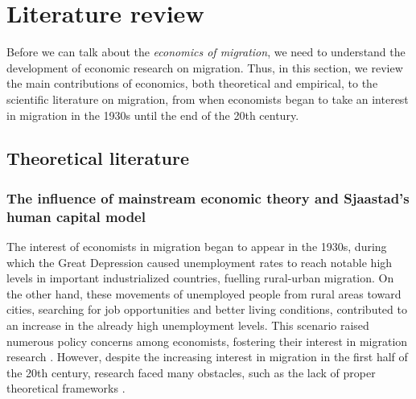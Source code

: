 \section{Literature review} \label{lit_review}

Before we can talk about the \textit{economics of migration}, we need to understand the development of economic research on migration. Thus, in this section, we review the main contributions of economics, both theoretical and empirical, to the scientific literature on migration, from when economists began to take an interest in migration in the 1930s until the end of the 20th century.

\subsection{Theoretical literature} \label{lit_review_theories}

\subsubsection{The influence of mainstream economic theory and Sjaastad's human capital model}

The interest of economists in migration began to appear in the 1930s, during which the Great Depression caused unemployment rates to reach notable high levels in important industrialized countries, fuelling rural-urban migration. On the other hand, these movements of unemployed people from rural areas toward cities, searching for job opportunities and better living conditions, contributed to an increase in the already high unemployment levels. This scenario raised numerous policy concerns among economists, fostering their interest in migration research \citep{lucas_internal_1997, greenwood_internal_1997, greenwood_early_2003}. However, despite the increasing interest in migration in the first half of the 20th century, research faced many obstacles, such as the lack of proper theoretical frameworks \citep{greenwood_early_2003}.

